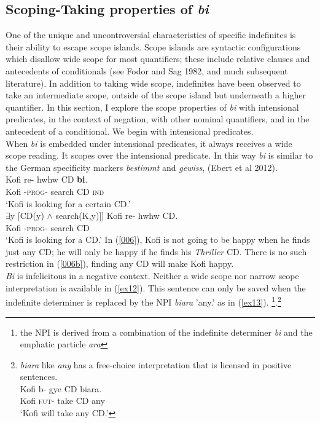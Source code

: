 \documentclass[output=paper,
modfonts
]{langsci/langscibook}
\begin{document}
\subsection{Scoping-Taking properties of \emph{bi}}
One of the unique and uncontroversial characteristics of specific indefinites is their ability to escape scope islands. Scope islands are syntactic configurations which disallow wide scope for most quantifiers; these include relative clauses and antecedents of conditionals (see Fodor and Sag 1982, and much subsequent literature). In addition to taking wide scope, indefinites have been observed to take an intermediate scope, outside of the scope island but underneath a higher quantifier. In this section, I explore the scope properties of \emph{bi} with intensional predicates, in the context of negation, with other nominal quantifiers, and in the antecedent of a conditional. We begin with intensional predicates.  \\
   When \emph{bi} is embedded under intensional predicates, it always receives a wide scope reading. It scopes over the intensional predicate. In this way \emph{bi} is similar to the German specificity markers \emph{bestimmt} and \emph{gewiss}, (Ebert et al 2012).
 \ea 
 \\
 \ea \label{006}
\gll Kofi re- hwhw CD \textbf{bi}.\\
    Kofi -\textsc{prog}-  search CD \textsc{ind}\\
\glt `Kofi is looking for a certain CD.'\\
$\exists$y [CD(y) $\wedge$ search(K,y)]]
\ex\label{006b}
\gll Kofi re- hwhw CD.\\
 Kofi -\textsc{prog}-  search CD  \\
\glt `Kofi is looking for a CD.'
\z \z In (\ref{006}), Kofi is not going to be happy when he finds just any CD; he will only be happy if he finds his \emph{Thriller} CD. There is no such restriction in (\ref{006b}), finding any CD will make Kofi happy. \\ \emph{Bi} is infelicitous in a negative context. Neither a wide scope nor narrow scope interpretation is available in (\ref{ex12}). This sentence can only be saved when the indefinite determiner is replaced by the NPI \emph{biara} 'any.' as in (\ref{ex13}). \footnote{the NPI is derived from a combination of the indefinite determiner \emph{bi} and the emphatic particle \emph{ara}}.\footnote{\emph{biara} like \emph{any} has a free-choice interpretation that is licensed in positive sentences.
\ea
{}\\
\label{ex120}
\gll  Kofi  b- gye CD biara.\\
Kofi \textsc{fut}-  take CD any \\
\glt `Kofi will take any CD.'
\z 
}  
\ea
{}\\
\end{document}
